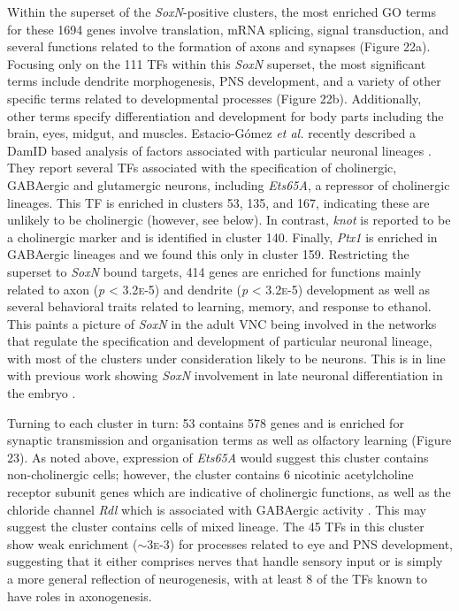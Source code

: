 \documentclass[withindex,glossary]{cam-thesis}
\begin{document}
Within the superset of the \emph{SoxN}-positive clusters, the most
enriched GO terms for these 1694 genes involve translation, mRNA
splicing, signal transduction, and several functions related to the
formation of axons and synapses (Figure 22a). Focusing only on the 111
TFs within this \emph{SoxN} superset, the most significant terms include
dendrite morphogenesis, PNS development, and a variety of other specific
terms related to developmental processes (Figure 22b). Additionally,
other terms specify differentiation and development for body parts
including the brain, eyes, midgut, and muscles. Estacio-Gómez \emph{et
al.} recently described a DamID based
analysis of factors associated with particular neuronal lineages . They
report several TFs associated with the specification of cholinergic,
GABAergic and glutamergic neurons, including \emph{Ets65A}, a repressor
of cholinergic lineages. This TF is enriched in clusters 53, 135, and
167, indicating these are unlikely to be cholinergic (however, see
below). In contrast, \emph{knot} is reported to be a cholinergic marker
and is identified in cluster 140. Finally, \emph{Ptx1} is enriched in
GABAergic lineages and we found this only in cluster 159. Restricting
the superset to \emph{SoxN} bound targets, 414 genes are enriched for
functions mainly related to axon (\emph{p} \textless{} 3.2\textsc{e}-5) and
dendrite (\emph{p} \textless{} 3.2\textsc{e}-5) development as well as several
behavioral traits related to learning, memory, and response to ethanol.
This paints a picture of \emph{SoxN} in the adult VNC being involved in
the networks that regulate the specification and development of
particular neuronal lineage, with most of the clusters under
consideration likely to be neurons. This is in line with previous work
showing \emph{SoxN} involvement in late neuronal differentiation in the
embryo .

Turning to each cluster in turn: 53 contains 578 genes and is enriched
for synaptic transmission and organisation terms as well as olfactory
learning (Figure 23). As noted above, expression of \emph{Ets65A} would
suggest this cluster contains non-cholinergic cells; however, the
cluster contains 6 nicotinic acetylcholine receptor subunit genes which
are indicative of cholinergic functions, as well as the chloride channel
\emph{Rdl} which is associated with GABAergic activity . This may suggest the cluster contains cells of mixed
lineage. The 45 TFs in this cluster show weak enrichment
($\sim{}$3\textsc{e}-3) for processes related to eye and PNS
development, suggesting that it either comprises nerves that handle
sensory input or is simply a more general reflection of neurogenesis,
with at least 8 of the TFs known to have roles in axonogenesis.
\end{document}
